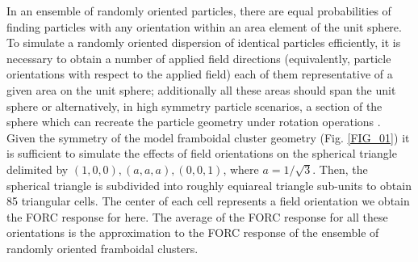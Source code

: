 In an ensemble of randomly oriented particles, there are equal probabilities of finding particles with any orientation within an area element of the unit sphere. To simulate a randomly oriented dispersion of identical particles efficiently, it is necessary to obtain a number of applied field directions (equivalently, particle orientations with respect to the applied field) each of them representative of a given area on the unit sphere; additionally all these areas should span the unit sphere or alternatively, in high symmetry particle scenarios, a section of the sphere which can recreate the particle geometry under rotation operations \citep{ValdezGrijalva2017,ValdezGrijalva2018}. Given the symmetry of the model framboidal cluster geometry (Fig. \ref{FIG_01}) it is sufficient to simulate the effects of field orientations on the spherical triangle delimited by $(1, 0, 0), (a, a, a), (0, 0, 1)$, where $a=1/\sqrt{3}$. Then, the spherical triangle is subdivided into roughly equiareal triangle sub-units to obtain 85 triangular cells. The center of each cell represents a field orientation we obtain the FORC response for here. The average of the FORC response for all these orientations is the approximation to the FORC response of the ensemble of randomly oriented framboidal clusters.\par

